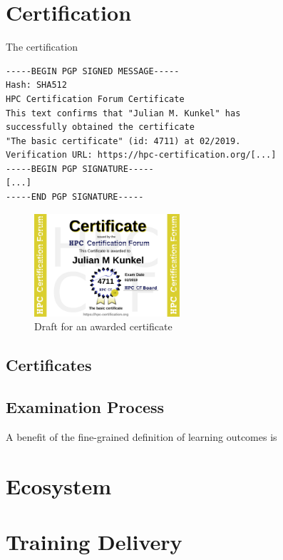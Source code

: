 \documentclass[jocse]{jocseart}
\begin{document}
\section{Certification}

The certification


\begin{verbatim}
-----BEGIN PGP SIGNED MESSAGE-----
Hash: SHA512
HPC Certification Forum Certificate
This text confirms that "Julian M. Kunkel" has
successfully obtained the certificate
"The basic certificate" (id: 4711) at 02/2019.
Verification URL: https://hpc-certification.org/[...]
-----BEGIN PGP SIGNATURE-----
[...]
-----END PGP SIGNATURE-----
\end{verbatim}




\begin{figure}
  \includegraphics[width=0.48\textwidth]{JulianMKunkel}
  \caption{Draft for an awarded certificate}
  \label{fig:awardedCertificate}
\end{figure}


\subsection{Certificates}

\subsection{Examination Process}

A benefit of the fine-grained definition of learning outcomes is

\section{Ecosystem}

\section{Training Delivery}
\end{document}
